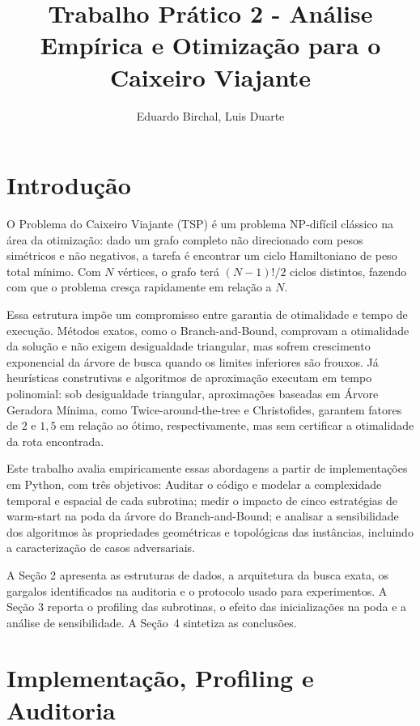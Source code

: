 \documentclass[12pt]{article}
\title{Trabalho Prático 2 - Análise Empírica e Otimização para o Caixeiro Viajante}
\author{Eduardo Birchal, Luis Duarte}
\begin{document}
 

\maketitle

\section{Introdução}

O Problema do Caixeiro Viajante (TSP) é um problema NP-difícil clássico na área da otimização: dado um grafo completo não direcionado com pesos simétricos e não negativos, a tarefa é encontrar um ciclo Hamiltoniano de peso total mínimo. Com $N$ vértices, o grafo terá $(N-1)!/2$ ciclos distintos, fazendo com que o problema cresça rapidamente em relação a $N$.

Essa estrutura impõe um compromisso entre garantia de otimalidade e tempo de execução. Métodos exatos, como o Branch-and-Bound, comprovam a otimalidade da solução e não exigem desigualdade triangular, mas sofrem crescimento exponencial da árvore de busca quando os limites inferiores são frouxos. Já heurísticas construtivas e algoritmos de aproximação executam em tempo polinomial: sob desigualdade triangular, aproximações baseadas em Árvore Geradora Mínima, como Twice-around-the-tree e Christofides, garantem fatores de $2$ e $1{,}5$ em relação ao ótimo, respectivamente, mas sem certificar a otimalidade da rota encontrada.

Este trabalho avalia empiricamente essas abordagens a partir de implementações em Python, com três objetivos: Auditar o código e modelar a complexidade temporal e espacial de cada subrotina; medir o impacto de cinco estratégias de warm-start na poda da árvore do Branch-and-Bound; e analisar a sensibilidade dos algoritmos às propriedades geométricas e topológicas das instâncias, incluindo a caracterização de casos adversariais.

A Seção 2 apresenta as estruturas de dados, a arquitetura da busca exata, os gargalos identificados na auditoria e o protocolo usado para experimentos. A Seção 3 reporta o profiling das subrotinas, o efeito das inicializações na poda e a análise de sensibilidade. A Seção~4 sintetiza as conclusões.

\section{Implementação, Profiling e Auditoria}
\end{document}
